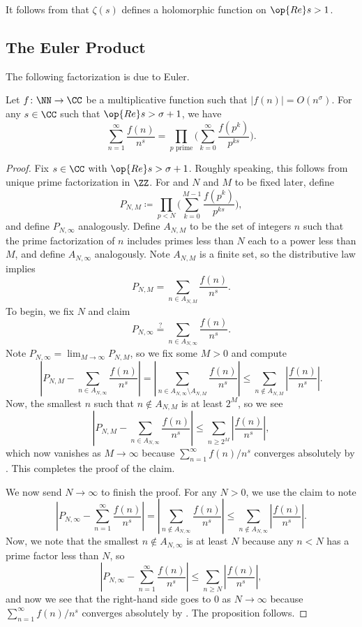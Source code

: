 \documentclass[../notes.tex]{subfiles}
\begin{document}
It follows from  that $\zeta(s)$ defines a holomorphic function on $\op{Re}s>1$.

\subsection{The Euler Product}
The following factorization is due to Euler.
\begin{proposition} \label{prop:euler-factor}
	Let $f\colon\NN\to\CC$ be a multiplicative function such that $|f(n)|=O\left(n^\sigma\right)$. For any $s\in\CC$ such that $\op{Re}s>\sigma+1$, we have
	\[\sum_{n=1}^\infty\frac{f(n)}{n^s}=\prod_{p\text{ prime}}\Bigg(\sum_{k=0}^\infty\frac{f\left(p^k\right)}{p^{ks}}\Bigg).\]
\end{proposition}
\begin{proof}
	Fix $s\in\CC$ with $\op{Re}s>\sigma+1$. Roughly speaking, this follows from unique prime factorization in $\ZZ$. For and $N$ and $M$ to be fixed later, define
	\[P_{N,M}\coloneqq\prod_{p<N}\Bigg(\sum_{k=0}^{M-1}\frac{f\left(p^k\right)}{p^{ks}}\Bigg),\]
	and define $P_{N,\infty}$ analogously. Define $A_{N,M}$ to be the set of integers $n$ such that the prime factorization of $n$ includes primes less than $N$ each to a power less than $M$, and define $A_{N,\infty}$ analogously. Note $A_{N,M}$ is a finite set, so the distributive law implies
	\[P_{N,M}=\sum_{n\in A_{N,M}}\frac{f(n)}{n^s}.\]
	To begin, we fix $N$ and claim
	\[P_{N,\infty}\stackrel?=\sum_{n\in A_{N,\infty}}\frac{f(n)}{n^s}.\]
	Note $P_{N,\infty}=\lim_{M\to\infty}P_{N,M}$, so we fix some $M>0$ and compute
	\[\left|P_{N,M}-\sum_{n\in A_{N,\infty}}\frac{f(n)}{n^s}\right|=\left|\sum_{n\in A_{N,\infty}\setminus A_{N,M}}\frac{f(n)}{n^s}\right|\le\sum_{n\notin A_{N,M}}\left|\frac{f(n)}{n^s}\right|.\]
	Now, the smallest $n$ such that $n\notin A_{N,M}$ is at least $2^M$, so we see
	\[\left|P_{N,M}-\sum_{n\in A_{N,\infty}}\frac{f(n)}{n^s}\right|\le\sum_{n\ge 2^M}\left|\frac{f(n)}{n^s}\right|,\]
	which now vanishes as $M\to\infty$ because $\sum_{n=1}^\infty f(n)/n^s$ converges absolutely by . This completes the proof of the claim.

	We now send $N\to\infty$ to finish the proof. For any $N>0$, we use the claim to note
	\[\left|P_{N,\infty}-\sum_{n=1}^\infty\frac{f(n)}{n^s}\right|=\left|\sum_{n\notin A_{N,\infty}}\frac{f(n)}{n^s}\right|\le\sum_{n\notin A_{N,\infty}}\left|\frac{f(n)}{n^s}\right|.\]
	Now, we note that the smallest $n\notin A_{N,\infty}$ is at least $N$ because any $n<N$ has a prime factor less than $N$, so
	\[\left|P_{N,\infty}-\sum_{n=1}^\infty\frac{f(n)}{n^s}\right|\le\sum_{n\ge N}\left|\frac{f(n)}{n^s}\right|,\]
	and now we see that the right-hand side goes to $0$ as $N\to\infty$ because $\sum_{n=1}^\infty f(n)/n^s$ converges absolutely by . The proposition follows.
\end{proof}
\end{document}
